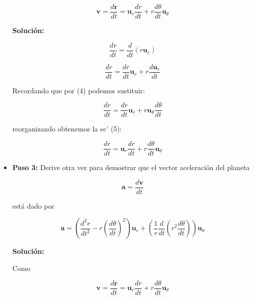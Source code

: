 \documentclass{article}
\begin{document}
\begin{itemize}
	\begin{equation}
		\mathbf{v} = \frac{d \mathbf{r}}{dt} = \mathbf{u}_r \frac{dr}{dt} + r \frac{d \theta}{dt} \mathbf{u}_\theta
	\end{equation}
	
	\textbf{Solución:}
	
	\begin{equation*}
		\frac{dr}{dt} = \frac{d}{dt}  \left( r \mathbf{u}_r \right)
	\end{equation*}
	
	\begin{equation*}
		\frac{dr}{dt} = \frac{dr}{dt} \mathbf{u}_r + r \frac{d \mathbf{u}_r}{dt}
	\end{equation*}
	
	Recordando que por (4) podemos sustituir:
	
	\begin{equation*}
		\frac{dr}{dt} = \frac{dr}{dt} \mathbf{u}_r + r \mathbf{u}_\theta \frac{d \theta}{dt}
	\end{equation*}
	
	reorganizando obtenemos la ec' (5):
	
	\begin{equation*}
		\frac{dr}{dt} = \mathbf{u}_r \frac{dr}{dt} + r \frac{d \theta}{dt} \mathbf{u}_\theta \tag{6}
	\end{equation*}
	
	\item \textbf{Paso 3:} Derive otra vez para demostrar que el vector aceleración del planeta
	
	\begin{equation*}
		\mathbf{a} = \frac{d \mathbf{v}}{dt}
	\end{equation*}
	
	está dado por 
	
	\begin{equation}
		\mathbf{a} = \left(\frac{d^2r}{dt^2} - r \left(\frac{d \theta}{dt}  \right)^2 \right) \mathbf{u}_r + \left(\frac{1}{r} \frac{d}{dt} \left( r^2 \frac{d \theta}{dt} \right) \right) \mathbf{u}_\theta
	\end{equation} 
	
	\textbf{Solución:}
	
	Como 
	
	\begin{equation*}
		\mathbf{v} = \frac{d \mathbf{r}}{dt} = \mathbf{u}_r \frac{dr}{dt} + r \frac{d \theta}{dt} \mathbf{u}_\theta
	\end{equation*}
	

\end{itemize}
\end{document}
